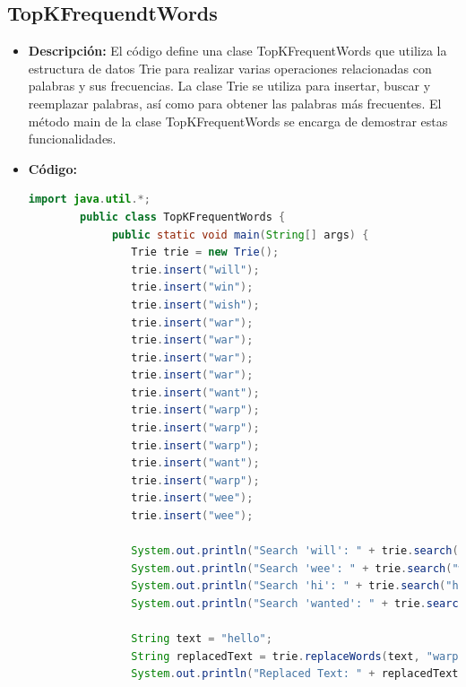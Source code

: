 \documentclass{article}
\begin{document}

  \subsection{TopKFrequendtWords}
  \begin{itemize}
    \item \textbf{Descripción: }El código define una clase TopKFrequentWords que utiliza la estructura de datos Trie para realizar varias operaciones relacionadas con 
    palabras y sus frecuencias. La clase Trie se utiliza para insertar, buscar y reemplazar palabras, así como para obtener las palabras 
    más frecuentes. El método main de la clase TopKFrequentWords se encarga de demostrar estas funcionalidades.
    \item \textbf{Código: }
    \begin{lstlisting}[language=Java, caption={Clase Principal}]
        import java.util.*;
        public class TopKFrequentWords {
             public static void main(String[] args) {
                Trie trie = new Trie();
                trie.insert("will");
                trie.insert("win");
                trie.insert("wish");
                trie.insert("war");
                trie.insert("war");
                trie.insert("war");
                trie.insert("war");
                trie.insert("want");
                trie.insert("warp");
                trie.insert("warp");
                trie.insert("warp");
                trie.insert("want");
                trie.insert("warp");
                trie.insert("wee");
                trie.insert("wee");
                
                System.out.println("Search 'will': " + trie.search("will")); 
                System.out.println("Search 'wee': " + trie.search("wee")); 
                System.out.println("Search 'hi': " + trie.search("hi")); 
                System.out.println("Search 'wanted': " + trie.search("wanted")); 

                String text = "hello";
                String replacedText = trie.replaceWords(text, "warp");
                System.out.println("Replaced Text: " + replacedText); // REPLACED REPLACED REPLACED hola


\end{lstlisting}
\end{itemize}
\end{document}
